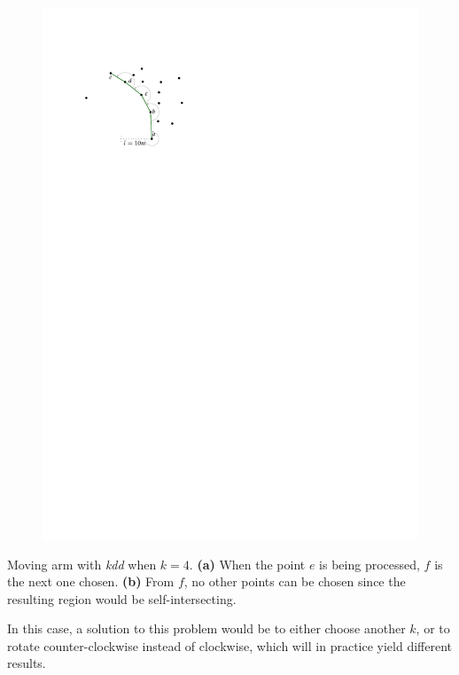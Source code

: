 \begin{marginfigure}
\begin{subfigure}[b]{.9\linewidth}
    \includegraphics[page=5,width=\textwidth]{figs/movingarm.pdf}
    \caption{}
  \end{subfigure}
\caption{Moving arm with \emph{kdd} when $k=4$. \textbf{(a)} When the point $e$ is being processed, $f$ is the next one chosen. \textbf{(b)} From $f$, no other points can be chosen since the resulting region would be self-intersecting.}%
\end{marginfigure}
In this case, a solution to this problem would be to either choose another $k$, or to rotate counter-clockwise instead of clockwise, which will in practice yield different results.


%
